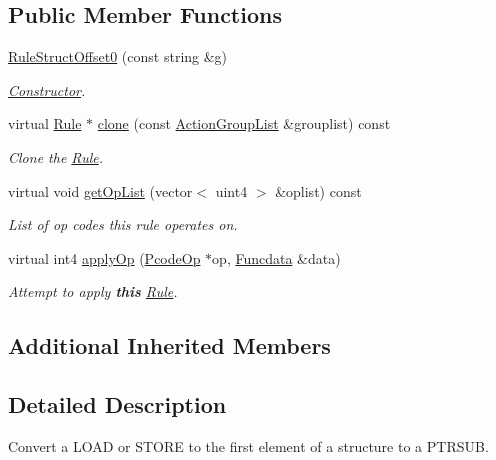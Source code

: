 \subsection*{Public Member Functions}
\begin{DoxyCompactItemize}
\item 
\mbox{\hyperlink{class_rule_struct_offset0_acbc30a7691ee47197444a77748f4f92d}{Rule\+Struct\+Offset0}} (const string \&g)
\begin{DoxyCompactList}\small\item\em \mbox{\hyperlink{class_constructor}{Constructor}}. \end{DoxyCompactList}\item 
virtual \mbox{\hyperlink{class_rule}{Rule}} $\ast$ \mbox{\hyperlink{class_rule_struct_offset0_a97dcd1e2e1e0649e22d204e21986bc93}{clone}} (const \mbox{\hyperlink{class_action_group_list}{Action\+Group\+List}} \&grouplist) const
\begin{DoxyCompactList}\small\item\em Clone the \mbox{\hyperlink{class_rule}{Rule}}. \end{DoxyCompactList}\item 
virtual void \mbox{\hyperlink{class_rule_struct_offset0_a332cb22239db665109ec37527e497dd1}{get\+Op\+List}} (vector$<$ uint4 $>$ \&oplist) const
\begin{DoxyCompactList}\small\item\em List of op codes this rule operates on. \end{DoxyCompactList}\item 
virtual int4 \mbox{\hyperlink{class_rule_struct_offset0_a925e149a62faa06ea1e64a9b9b52a47f}{apply\+Op}} (\mbox{\hyperlink{class_pcode_op}{Pcode\+Op}} $\ast$op, \mbox{\hyperlink{class_funcdata}{Funcdata}} \&data)
\begin{DoxyCompactList}\small\item\em Attempt to apply {\bfseries{this}} \mbox{\hyperlink{class_rule}{Rule}}. \end{DoxyCompactList}\end{DoxyCompactItemize}
\subsection*{Additional Inherited Members}


\subsection{Detailed Description}
Convert a L\+O\+AD or S\+T\+O\+RE to the first element of a structure to a P\+T\+R\+S\+UB. 


